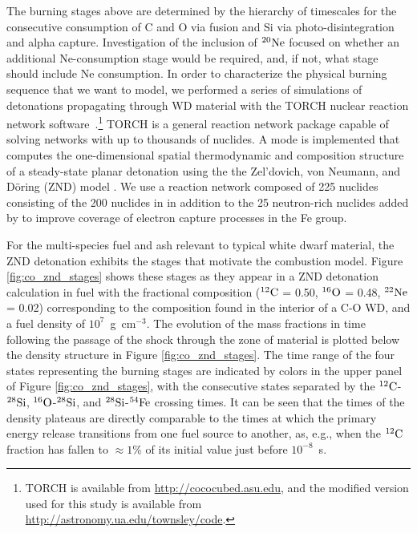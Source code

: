 \documentclass[iop,apj]{emulateapj}
\newcommand{\C}[1]{\ensuremath{{}^{#1}{\rm C}}}
\newcommand{\Ox}[1]{\ensuremath{{}^{#1}{\rm O}}}
\newcommand{\Ne}[1]{\ensuremath{{}^{#1}{\rm Ne}}}
\newcommand{\Si}[1]{\ensuremath{{}^{#1}{\rm Si}}}
\newcommand{\Fe}[1]{\ensuremath{{}^{#1}{\rm Fe}}}
\begin{document}
The burning stages above are determined by the hierarchy of timescales
for the consecutive consumption of C and O via fusion and Si via
photo-disintegration and alpha capture. Investigation of the inclusion
of \Ne{20} focused on whether an additional Ne-consumption stage would
be required, and, if not, what stage should include Ne consumption. In
order to characterize the physical burning sequence that we want to
model, we performed a series of simulations of detonations propagating
through WD material with the TORCH nuclear reaction network
software~\citep{timmes1999,torch}.\footnote{TORCH is available from
  \url{http://cococubed.asu.edu}, and the modified version used for
  this study is available from
  \url{http://astronomy.ua.edu/townsley/code}.} TORCH is a general
reaction network package capable of solving networks with up to
thousands of nuclides. A mode is implemented that computes the
one-dimensional spatial thermodynamic and composition structure of a
steady-state planar detonation using the the Zel'dovich, von Neumann,
and D\"{o}ring (ZND) model \citep{FickDavi79,townetal15}. We use a
reaction network composed of 225 nuclides consisting of the 200
nuclides in \citet{Woosley1995The-Evolution-a} in addition to the 25
neutron-rich nuclides added by \citet{Caldetal07} to improve coverage
of electron capture processes in the Fe group.

For the multi-species fuel and ash relevant to typical white dwarf material, the ZND detonation exhibits the stages that motivate the combustion model.
Figure \ref{fig:co_znd_stages} shows these stages as they appear in a
ZND detonation calculation in fuel with the fractional composition
(\C{12} = 0.50, \Ox{16} = 0.48, \Ne{22} = 0.02) corresponding to
the composition found in the interior of a C-O WD, and a fuel density of $10^7$~g~cm$^{-3}$.
The evolution of the mass fractions in time following the passage of the shock through 
the zone of material is plotted below the density structure in Figure \ref{fig:co_znd_stages}.
The time range of the four states representing the burning stages are indicated by colors in the upper panel of Figure \ref{fig:co_znd_stages}, with the consecutive states separated by the
\C{12}-\Si{28}, \Ox{16}-\Si{28}, and \Si{28}-\Fe{54} crossing times.
It can be seen that the times of the density plateaus are directly comparable to the times at which the primary energy release transitions from one fuel source to another, 
as, e.g., when the \C{12} fraction has fallen
to $\approx1\%$ of its initial value just before $10^{-8}$~s.
\end{document}
